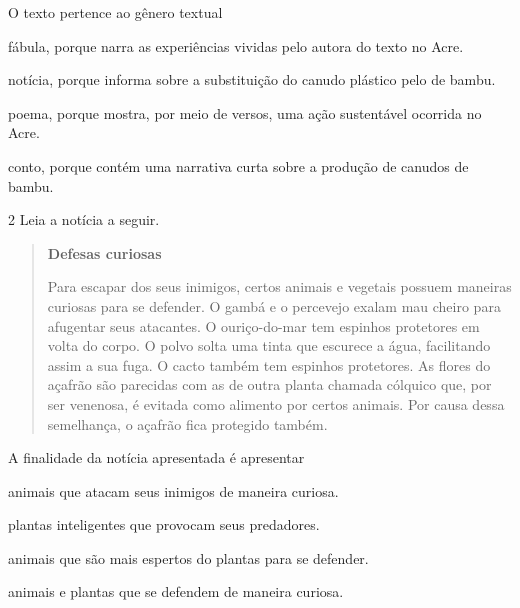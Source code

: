 O texto pertence ao gênero textual

\begin{escolha}
\item fábula, porque narra as experiências vividas pelo autora do texto no Acre.

\item notícia, porque informa sobre a substituição do canudo plástico pelo de bambu.

\item poema, porque mostra, por meio de versos, uma ação sustentável ocorrida no Acre.

\item conto, porque contém uma narrativa curta sobre a produção de canudos de bambu.
\end{escolha}



\num{2} Leia a notícia a seguir.

\begin{quote}
\textbf{Defesas curiosas}

Para escapar dos seus inimigos, certos animais e vegetais possuem
maneiras curiosas para se defender. O gambá e o percevejo exalam mau
cheiro para afugentar seus atacantes. O ouriço-do-mar tem espinhos
protetores em volta do corpo. O polvo solta uma tinta que escurece a
água, facilitando assim a sua fuga. O cacto também tem espinhos
protetores. As flores do açafrão são parecidas com as de outra planta
chamada cólquico que, por ser venenosa, é evitada como alimento por
certos animais. Por causa dessa semelhança, o açafrão fica protegido
também.

\end{quote}
\pagebreak

A finalidade da notícia apresentada é apresentar

\begin{escolha}
\item animais que atacam seus inimigos de maneira curiosa.

\item plantas inteligentes que provocam seus predadores.

\item animais que são mais espertos do plantas para se defender.

\item animais e plantas que se defendem de maneira curiosa.
\end{escolha}




